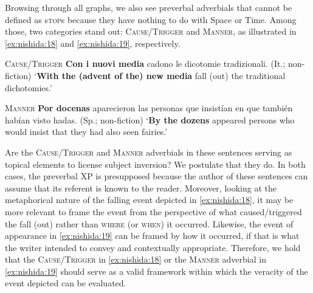 \documentclass[output=paper,colorlinks,citecolor=brown,
]{langscibook}
\begin{document}
Browsing through all graphs, we also see preverbal adverbials that cannot be defined as s\textsc{top}s because they have nothing to do with Space or Time. Among those, two categories stand out: \textsc{Cause/Trigger} and \textsc{Manner}, as illustrated in \ref{ex:nishida:18} and \ref{ex:nishida:19}, respectively.  

\begin{exe}
    \ex\label{ex:nishida:18}
    
    \textsc{Cause/Trigger} \quad	\textbf{Con i nuovi media} cadono le dicotomie tradizionali. 
    (It.; non-fiction)
    \glt `\textbf{With the (advent of the) new media} fall (out) the traditional 										dichotomies.'
\end{exe}

\begin{exe}
    \ex\label{ex:nishida:19}
    
    \textsc{Manner} \quad \textbf{Por docenas} aparecieron las personas que insistían en que también habían visto hadas. (Sp.; non-fiction)
    \glt `\textbf{By the dozens} appeared persons who would insist that they had also seen fairies.'     
\end{exe}

Are the  \textsc{Cause/Trigger} and  \textsc{Manner} adverbials in these sentences serving as topical elements to license subject inversion? We postulate that they do. In both cases, the preverbal XP is presupposed because the author of these sentences can assume that its referent is known to the reader. Moreover, looking at the metaphorical nature of the falling event depicted in \ref{ex:nishida:18}, it may be more relevant to frame the event from the perspective of what  caused/triggered the fall (out) rather than  \textsc{where} (or  \textsc{when}) it occurred. Likewise, the event of appearance in \ref{ex:nishida:19} can be framed by how it occurred, if that is what the writer intended to convey and contextually appropriate. Therefore, we hold that the  \textsc{Cause/Trigger} in \ref{ex:nishida:18} or the  \textsc{Manner} adverbial in \ref{ex:nishida:19} should serve as a valid framework within which the veracity of the event depicted can be evaluated. 	 
\end{document}
